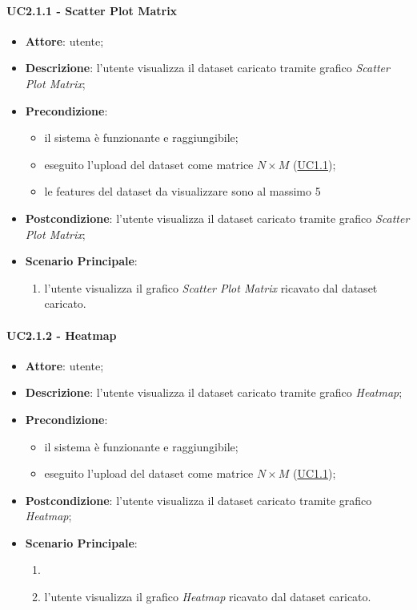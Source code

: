     \paragraph{UC2.1.1 - Scatter Plot Matrix}
    \label{uc2.1.1}
    \begin{itemize}
    \item \textbf{Attore}: utente;
    \item \textbf{Descrizione}: l'utente visualizza il dataset caricato tramite grafico \emph{Scatter Plot Matrix};
    \item \textbf{Precondizione}:
    \begin{itemize}
        \item il sistema è funzionante e raggiungibile;
        \item eseguito l'upload del dataset come matrice $N\times M$ (\hyperref[uc1.1]{UC1.1});
        \item le features del dataset da visualizzare sono al massimo 5
    \end{itemize}
    \item \textbf{Postcondizione}: l'utente visualizza il dataset caricato tramite grafico \emph{Scatter Plot Matrix};
    \item \textbf{Scenario Principale}: 
        \begin{enumerate}
            \item l'utente visualizza il grafico \emph{Scatter Plot Matrix} ricavato dal dataset caricato.
        \end{enumerate}
    \end{itemize}
    
    \paragraph{UC2.1.2 - Heatmap}
    \label{uc2.1.2}
    \begin{itemize}
    \item \textbf{Attore}: utente;
    \item \textbf{Descrizione}: l'utente visualizza il dataset caricato tramite grafico \emph{Heatmap};
    \item \textbf{Precondizione}:
    \begin{itemize}
        \item il sistema è funzionante e raggiungibile;
        \item eseguito l'upload del dataset come matrice $N\times M$ (\hyperref[uc1.1]{UC1.1});
    \end{itemize}
    \item \textbf{Postcondizione}: l'utente visualizza il dataset caricato tramite grafico \emph{Heatmap};
    \item \textbf{Scenario Principale}: 
        \begin{enumerate}
            \item \item l'utente visualizza il grafico \emph{Heatmap} ricavato dal dataset caricato.
        \end{enumerate}
    \end{itemize}
    
